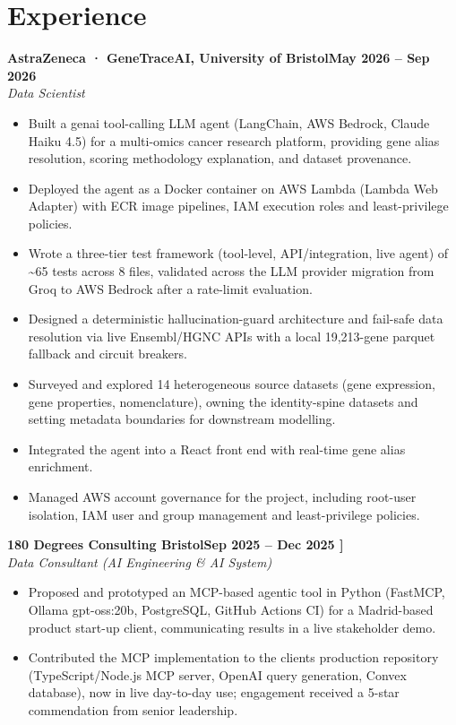 \documentclass[a4paper,11pt]{article}
\newcommand{\entry}[4]{\needspace{4\baselineskip}\noindent\textbf{#1}\hfill\textbf{#2}\\ \textit{#3}\hfill\textit{#4}\par}
\begin{document}
\section{Experience}
\entry{AstraZeneca · GeneTraceAI, University of Bristol}{May 2026 – Sep 2026}{Data Scientist}{}
\begin{itemize}
  \item Built a genai tool-calling LLM agent (LangChain, AWS Bedrock, Claude Haiku 4.5) for a multi-omics cancer research platform, providing gene alias resolution, scoring methodology explanation, and dataset provenance.
  \item Deployed the agent as a Docker container on AWS Lambda (Lambda Web Adapter) with ECR image pipelines, IAM execution roles and least-privilege policies.
  \item Wrote a three-tier test framework (tool-level, API/integration, live agent) of \textasciitilde{}65 tests across 8 files, validated across the LLM provider migration from Groq to AWS Bedrock after a rate-limit evaluation.
  \item Designed a deterministic hallucination-guard architecture and fail-safe data resolution via live Ensembl/HGNC APIs with a local 19,213-gene parquet fallback and circuit breakers.
  \item Surveyed and explored 14 heterogeneous source datasets (gene expression, gene properties, nomenclature), owning the identity-spine datasets and setting metadata boundaries for downstream modelling.
  \item Integrated the agent into a React front end with real-time gene alias enrichment.
  \item Managed AWS account governance for the project, including root-user isolation, IAM user and group management and least-privilege policies.
\end{itemize}
\vspace{4pt}
\entry{180 Degrees Consulting Bristol}{Sep 2025 – Dec 2025   ]}{Data Consultant (AI Engineering \& AI System)}{}
\begin{itemize}
  \item Proposed and prototyped an MCP-based agentic tool in Python (FastMCP, Ollama gpt-oss:20b, PostgreSQL, GitHub Actions CI) for a Madrid-based product start-up client, communicating results in a live stakeholder demo.
  \item Contributed the MCP implementation to the client\textquotesingle{}s production repository (TypeScript/Node.js MCP server, OpenAI query generation, Convex database), now in live day-to-day use; engagement received a 5-star commendation from senior leadership.
\end{itemize}
\end{document}
